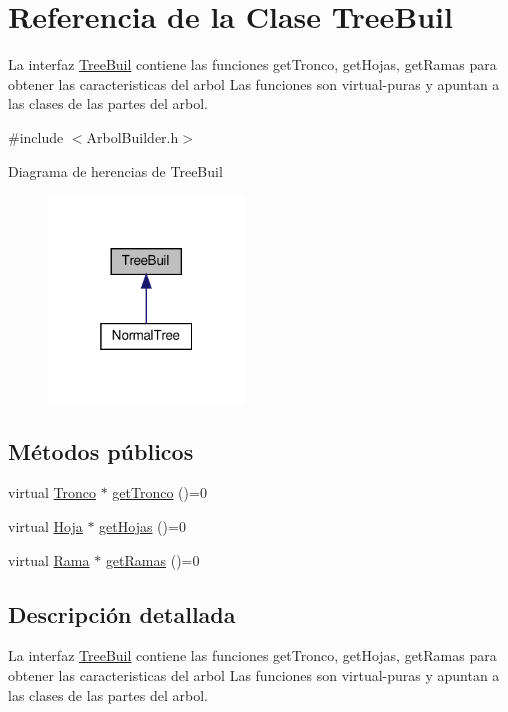 \hypertarget{classTreeBuil}{}\section{Referencia de la Clase Tree\+Buil}
\label{classTreeBuil}


La interfaz \hyperlink{classTreeBuil}{Tree\+Buil} contiene las funciones get\+Tronco, get\+Hojas, get\+Ramas para obtener las caracteristicas del arbol  Las funciones son virtual-\/puras y apuntan a las clases de las partes del arbol.  




{\ttfamily \#include $<$Arbol\+Builder.\+h$>$}



Diagrama de herencias de Tree\+Buil
\nopagebreak
\begin{figure}[H]
\begin{center}
\leavevmode
\includegraphics[width=148pt]{classTreeBuil__inherit__graph}
\end{center}
\end{figure}
\subsection*{Métodos públicos}
\begin{DoxyCompactItemize}
\item 
virtual \hyperlink{classTronco}{Tronco} $\ast$ \hyperlink{classTreeBuil_a083d65b3e44e233b9a2a9305bcdabb8c}{get\+Tronco} ()=0
\item 
virtual \hyperlink{classHoja}{Hoja} $\ast$ \hyperlink{classTreeBuil_a76ddaf2d79386ffabe5bf17e0c6d887e}{get\+Hojas} ()=0
\item 
virtual \hyperlink{classRama}{Rama} $\ast$ \hyperlink{classTreeBuil_ad8c90d4466a151a8082eeae13400e6cc}{get\+Ramas} ()=0
\end{DoxyCompactItemize}


\subsection{Descripción detallada}
La interfaz \hyperlink{classTreeBuil}{Tree\+Buil} contiene las funciones get\+Tronco, get\+Hojas, get\+Ramas para obtener las caracteristicas del arbol  Las funciones son virtual-\/puras y apuntan a las clases de las partes del arbol. 

